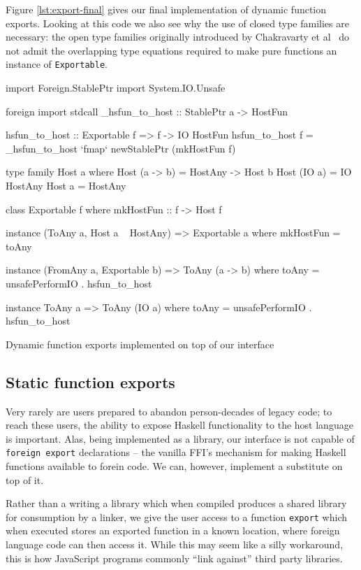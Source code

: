 \documentclass[preprint]{sigplanconf}
\begin{document}
Figure \ref{lst:export-final} gives our final implementation of dynamic
function exports.
Looking at this code we also see why the use of closed type families are
necessary: the open type families originally introduced by Chakravarty et
al\ \cite{typefamilies} do not admit the overlapping type equations required
to make pure functions an instance of \lstinline!Exportable!.

\begin{listingfloat}
\begin{code}
import Foreign.StablePtr
import System.IO.Unsafe

foreign import stdcall
  _hsfun_to_host :: StablePtr a -> HostFun

hsfun_to_host :: Exportable f => f -> IO HostFun
hsfun_to_host f =
  _hsfun_to_host `fmap` newStablePtr (mkHostFun f)

type family Host a where
  Host (a -> b) = HostAny -> Host b
  Host (IO a)   = IO HostAny
  Host a        = HostAny

class Exportable f where
  mkHostFun :: f -> Host f

instance (ToAny a, Host a ~ HostAny) =>
          Exportable a where
  mkHostFun = toAny

instance (FromAny a, Exportable b) =>
          ToAny (a -> b) where
  toAny = unsafePerformIO . hsfun_to_host

instance ToAny a => ToAny (IO a) where
  toAny = unsafePerformIO . hsfun_to_host
\end{code}
\caption{Dynamic function exports implemented on top of our interface}
\label{lst:export-final}
\end{listingfloat}

\subsection{Static function exports}
\label{sec:exports}
Very rarely are users prepared to abandon person-decades of legacy code;
to reach these users, the ability to expose Haskell functionality to the host
language is important. Alas, being implemented as a library, our interface is
not capable of \lstinline!foreign export! declarations -- the vanilla FFI's
mechanism for making Haskell functions available to forein code. We can, however,
implement a substitute on top of it.

Rather than a writing a library which when compiled produces a shared library
for consumption by a linker, we give the user access to a function
\lstinline!export! which when executed stores an exported function in a
known location, where foreign language code can then access it.
While this may seem like a silly workaround, this is how JavaScript programs
commonly ``link against'' third party libraries.
\end{document}
